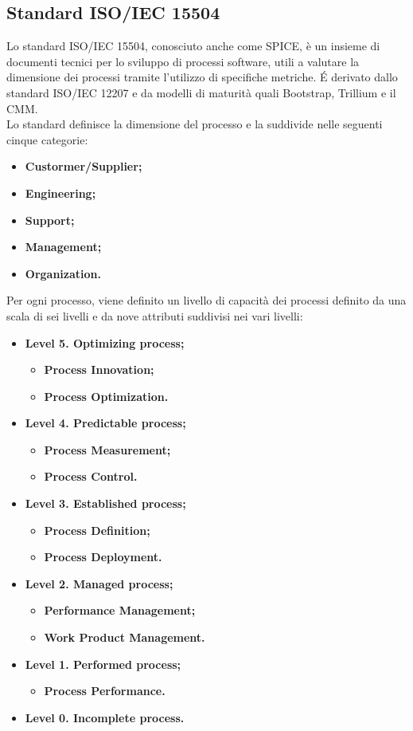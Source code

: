 	\subsection{Standard ISO/IEC 15504}
	Lo standard ISO/IEC 15504, conosciuto anche come SPICE, è un insieme di documenti tecnici per lo sviluppo di processi software, utili a valutare la dimensione dei processi tramite l'utilizzo di specifiche metriche. É derivato dallo standard ISO/IEC 12207 e da modelli di maturità quali Bootstrap, Trillium e il CMM.\\
	Lo standard definisce la dimensione del processo e la suddivide nelle seguenti cinque categorie:
		\begin{itemize}
			\item \textbf{Custormer/Supplier;}
			\item \textbf{Engineering;}
			\item \textbf{Support;}
			\item \textbf{Management;}
			\item \textbf{Organization.}
		\end{itemize}
	Per ogni processo, viene definito un livello di capacità dei processi definito da una scala di sei livelli e da nove attributi suddivisi nei vari livelli:
		\begin{itemize}
			\item \textbf{Level 5. Optimizing process;}
				\begin{itemize}
					\item \textbf{Process Innovation;}
					\item \textbf{Process Optimization.}
				\end{itemize}
			\item \textbf{Level 4. Predictable process;}
				\begin{itemize}
					\item \textbf{Process Measurement;}
					\item \textbf{Process Control.}
				\end{itemize}
			\item \textbf{Level 3. Established process;}
				\begin{itemize}
					\item \textbf{Process Definition;}
					\item \textbf{Process Deployment.}
				\end{itemize}
			\item \textbf{Level 2. Managed process;}
				\begin{itemize}
					\item \textbf{Performance Management;}
					\item \textbf{Work Product Management.}
				\end{itemize}			
			\item \textbf{Level 1. Performed process;}
				\begin{itemize}
					\item \textbf{Process Performance.}
				\end{itemize}
			\item \textbf{Level 0. Incomplete process.}
		\end{itemize}
